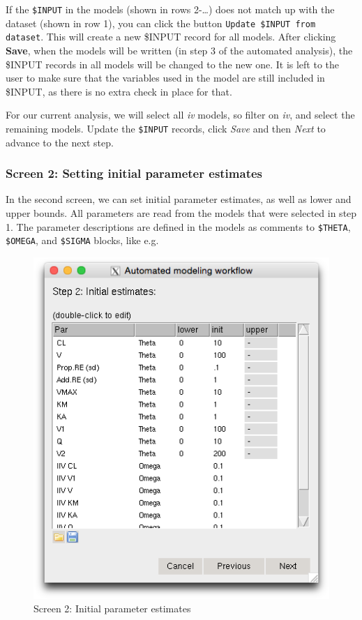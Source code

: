 If the \texttt{\$INPUT} in the models (shown in rows 2-\ldots{}) does
not match up with the dataset (shown in row 1), you can click the button
\texttt{Update \$INPUT from dataset}. This will create a new \$INPUT
record for all models. After clicking \textbf{Save}, when the models
will be written (in step 3 of the automated analysis), the \$INPUT
records in all models will be changed to the new one. It is left to the
user to make sure that the variables used in the model are still
included in \$INPUT, as there is no extra check in place for that.

For our current analysis, we will select all \emph{iv} models, so filter
on \emph{iv}, and select the remaining models. Update the
\texttt{\$INPUT} records, click \emph{Save} and then \emph{Next} to
advance to the next step.


\subsubsection*{Screen 2: Setting initial parameter
estimates}\label{screen-2-setting-initial-parameter-estimates}

In the second screen, we can set initial parameter estimates, as well as
lower and upper bounds. All parameters are read from the models that
were selected in step 1. The parameter descriptions are defined in the
models as comments to \texttt{\$THETA}, \texttt{\$OMEGA}, and
\texttt{\$SIGMA} blocks, like e.g.

\begin{figure}[htbp]
\centering
\includegraphics[scale=0.5]{images/screen2.png}
\caption{Screen 2: Initial parameter estimates}
\end{figure}

